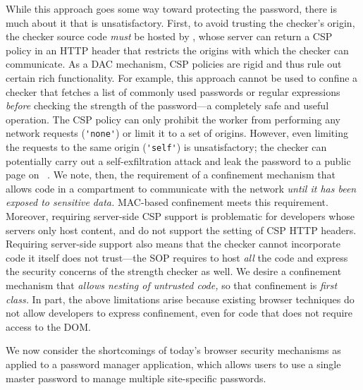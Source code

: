While this approach goes some way toward protecting the password, there
is much about it that is unsatisfactory.
%
First, to avoid trusting the checker's origin, the checker source code
{\em must} be hosted by , whose server can return a
CSP policy in an HTTP header that restricts the origins with which the
checker can communicate. As a DAC mechanism, CSP policies are rigid
and thus rule out certain rich functionality. For example, this
approach cannot be used to confine a checker that fetches a list of
commonly used passwords or regular expressions {\em before} checking
the strength of the password---a completely safe and useful operation. 
%
The CSP policy can only prohibit the worker from performing any
network requests (\verb|'none'|) or limit it to a set of origins.
%
However, even limiting the requests to the same origin (\verb|'self'|)
is unsatisfactory; the checker can potentially carry out a
self-exfiltration attack and leak the password to a public page on
~\cite{selfex}.
%
We note, then, the requirement of a confinement
mechanism that allows code in a compartment to communicate with the
network {\em until it has been exposed to sensitive data.} MAC-based
confinement meets this requirement.
%
Moreover, requiring server-side CSP support is problematic for
developers whose servers only host content, and do not support the
setting of CSP HTTP headers.
%
Requiring server-side support also means that the checker cannot
incorporate code it itself does not trust---the SOP requires
 to host {\em all} the code and express the
security concerns of the strength checker as well. We desire a
confinement mechanism that {\em allows nesting of untrusted code,}
so that confinement is {\em first class.}
%
%
%
In part, the above limitations arise because existing browser
techniques do not allow developers to express confinement, even for
code that does not require access to the DOM.

%
We now consider the shortcomings of today's browser security
mechanisms as applied to a password manager application, which allows
users to use a single master password to manage multiple site-specific
passwords.


